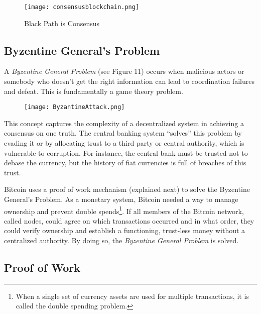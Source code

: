 \documentclass[12pt]{article}
\newcommand{\1}{\mathbbm 1}
\begin{document}
		
		
		
		\begin{figure}[H]
			\begin{Center}
				\texttt{[image: consensusblockchain.png]}	\caption{Black Path is Consensus}
			\end{Center}
		\end{figure}
		
		
		\subsection{\textbf{Byzentine General's Problem}}
		
		
		
		
		
		A \textit{Byzentine General Problem} (see Figure 11) occurs when malicious actors or somebody who doesn't get the right information can lead to coordination failures and defeat. This is fundamentally a game theory problem.
		
		
		\begin{figure}[H]
			\begin{Center}
				\texttt{[image: ByzantineAttack.png]}		
				\caption{}
			\end{Center}
		\end{figure}
		
		This concept captures the complexity of a decentralized system in achieving a consensus on one truth. The central banking system ``solves'' this problem by evading it or by allocating trust to a third party or central authority, which is vulnerable to corruption. For instance, the central bank must be trusted not to debase the currency, but the history of fiat currencies is full of breaches of this trust.
		
		Bitcoin uses a proof of work mechanism (explained next) to solve the Byzentine General's Problem. As a monetary system, Bitcoin needed a way to manage ownership and prevent double spends\footnote{When a single set of currency assets are used for multiple transactions, it is called the double spending problem.}. If all members of the Bitcoin network, called nodes, could agree on which transactions occurred and in what order, they could verify ownership and establish a functioning, trust-less money without a centralized authority. By doing so, the \textit{Byzentine General Problem} is solved.
		
		
		
		\subsection{\textbf{Proof of Work}}
		
\end{document}
